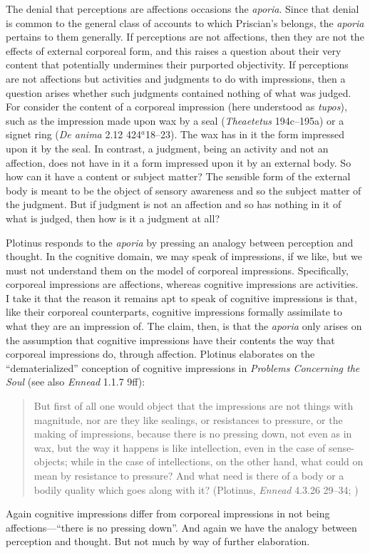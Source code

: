 \documentclass[12pt]{article}
\begin{document}
The denial that perceptions are affections occasions the \emph{aporia}. Since that denial is common to the general class of accounts to which Priscian's belongs, the \emph{aporia} pertains to them generally. If perceptions are not affections, then they are not the effects of external corporeal form, and this raises a question about their very content that potentially undermines their purported objectivity. If perceptions are not affections but activities and judgments to do with impressions, then a question arises whether such judgments contained nothing of what was judged. For consider the content of a corporeal impression (here understood as \emph{tupos}), such as the impression made upon wax by a seal (\emph{Theaetetus} 194c--195a) or a signet ring (\emph{De anima} 2.12 424\( ^{a} \)18--23). The wax has in it the form impressed upon it by the seal. In contrast, a judgment, being an activity and not an affection, does not have in it a form impressed upon it by an external body. So how can it have a content or subject matter? The sensible form of the external body is meant to be the object of sensory awareness and so the subject matter of the judgment. But if judgment is not an affection and so has nothing in it of what is judged, then how is it a judgment at all?

Plotinus responds to the \emph{aporia} by pressing an analogy between perception and thought. In the cognitive domain, we may speak of impressions, if we like, but we must not understand them on the model of corporeal impressions. Specifically, corporeal impressions are affections, whereas cognitive impressions are activities. I take it that the reason it remains apt to speak of cognitive impressions is that, like their corporeal counterparts, cognitive impressions formally assimilate to what they are an impression of. The claim, then, is that the \emph{aporia} only arises on the assumption that cognitive impressions have their contents the way that corporeal impressions do, through affection. Plotinus elaborates on the ``dematerialized'' conception of cognitive impressions in \emph{Problems Concerning the Soul} (see also \emph{Ennead} 1.1.7 9ff):
\begin{quote}
	But first of all one would object that the impressions are not things with magnitude, nor are they like sealings, or resistances to pressure, or the making of impressions, because there is no pressing down, not even as in wax, but the way it happens is like intellection, even in the case of sense-objects; while in the case of intellections, on the other hand, what could on mean by resistance to pressure? And what need is there of a body or a bodily quality which goes along with it? (Plotinus, \emph{Ennead} 4.3.26 29--34; \citealt[101]{Dillon:2015yf})
\end{quote}
Again cognitive impressions differ from corporeal impressions in not being affec\-tions---``there is no pressing down''. And again we have the analogy between perception and thought. But not much by way of further elaboration.
\end{document}
